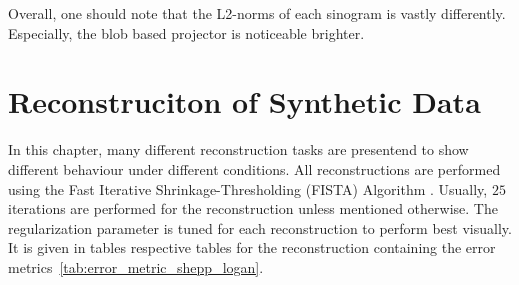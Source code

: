 Overall, one should note that the L2-norms of each sinogram is vastly differently. Especially, the
blob based projector is noticeable brighter. 

\section{Reconstruciton of Synthetic Data}\label{sec:experiments_synthethic_projection}


In this chapter, many different reconstruction tasks are presentend to show different behaviour
under different conditions. All reconstructions are performed using the Fast Iterative
Shrinkage-Thresholding (FISTA) Algorithm . Usually, \(25\) iterations are
performed for the reconstruction unless mentioned otherwise. The regularization parameter is tuned
for each reconstruction to perform best visually. It is given in tables respective tables for the
reconstruction containing the error metrics~\ref{tab:error_metric_shepp_logan}.

